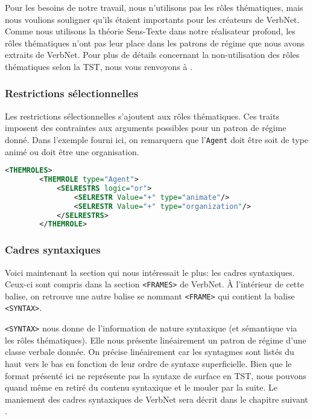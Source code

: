 Pour les besoins de notre travail, nous n'utilisons pas les rôles thématiques, mais nous voulions souligner qu'ils étaient importants pour les créateurs de VerbNet. Comme nous utilisons la théorie Sens-Texte dans notre réalisateur profond, les rôles thématiques n'ont pas leur place dans les patrons de régime que nous avons extraits de VerbNet. Pour plus de détails concernant la non-utilisation des rôles thématiques selon la TST, nous vous renvoyons à .

\subsubsection{Restrictions sélectionnelles}
Les restrictions sélectionnelles s'ajoutent aux rôles thématiques. Ces traits imposent des contraintes aux arguments possibles pour un patron de régime donné. Dans l'exemple fourni ici, on remarquera que l'\texttt{Agent} doit être soit de type animé ou doit être une organisation.

\begin{lstlisting}[language=Xml, caption = Les restrictions sélectionnelles]
    <THEMROLES>
        <THEMROLE type="Agent">
            <SELRESTRS logic="or">
                <SELRESTR Value="+" type="animate"/>
                <SELRESTR Value="+" type="organization"/>
            </SELRESTRS>
        </THEMROLE>
\end{lstlisting}

\subsubsection{Cadres syntaxiques}

Voici maintenant la section qui nous intéressait le plus: les cadres syntaxiques. Ceux-ci sont compris dans la section \lstinline{<FRAMES>} de VerbNet. À l'intérieur de cette balise, on retrouve une autre balise se nommant \lstinline{<FRAME>} qui contient la balise \lstinline{<SYNTAX>}.

\lstinline{<SYNTAX>} nous donne de l'information de nature syntaxique (et sémantique via les rôles thématiques). Elle nous présente linéairement un patron de régime d'une classe verbale donnée. On précise linéairement car les syntagmes sont listés du haut vers le bas en fonction de leur ordre de syntaxe superficielle. Bien que le format présenté ici ne représente pas la syntaxe de surface en TST, nous pouvons quand même en retiré du contenu syntaxique et le mouler par la suite. Le maniement des cadres syntaxiques de VerbNet sera décrit dans le chapitre suivant .

